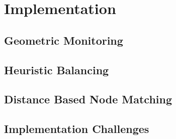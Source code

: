 \chapter{Implementation} \label{chap:impl}
\section{Geometric Monitoring} \label{sec:impl-GM}

\section{Heuristic Balancing} \label{sec:impl-heuristic}

\section{Distance Based Node Matching} \label{sec:impl-distNodeMatch}

\section{Implementation Challenges} \label{sec:impl-implChallenges}